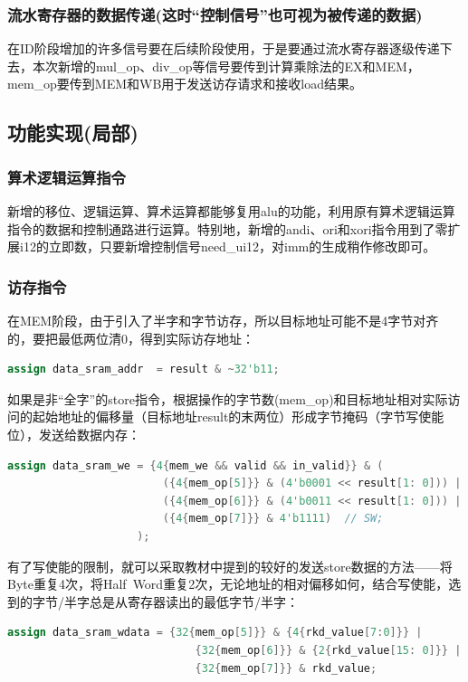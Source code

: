 \documentclass[11pt]{article}
\begin{document}
\subsubsection{流水寄存器的数据传递(这时“控制信号”也可视为被传递的数据)}
在ID阶段增加的许多信号要在后续阶段使用，于是要通过流水寄存器逐级传递下去，本次新增的mul_op、div_op等信号要传到计算乘除法的EX和MEM，mem_op要传到MEM和WB用于发送访存请求和接收load结果。


\subsection{功能实现(局部)}

\subsubsection{算术逻辑运算指令}
新增的移位、逻辑运算、算术运算都能够复用alu的功能，利用原有算术逻辑运算指令的数据和控制通路进行运算。特别地，新增的andi、ori和xori指令用到了零扩展i12的立即数，只要新增控制信号need_ui12，对imm的生成稍作修改即可。

\subsubsection{访存指令}

在MEM阶段，由于引入了半字和字节访存，所以目标地址可能不是4字节对齐的，要把最低两位清0，得到实际访存地址：
\begin{lstlisting}[language=Verilog, caption={访存地址}]
assign data_sram_addr  = result & ~32'b11;
\end{lstlisting}

如果是非“全字”的store指令，根据操作的字节数(mem_op)和目标地址相对实际访问的起始地址的偏移量（目标地址result的末两位）形成字节掩码（字节写使能位），发送给数据内存：
\begin{lstlisting}[language=Verilog, caption={store字节写使能}]
assign data_sram_we = {4{mem_we && valid && in_valid}} & (
                        ({4{mem_op[5]}} & (4'b0001 << result[1: 0])) |  // SB
                        ({4{mem_op[6]}} & (4'b0011 << result[1: 0])) |  // SH
                        ({4{mem_op[7]}} & 4'b1111)  // SW;
                    );
\end{lstlisting}
有了写使能的限制，就可以采取教材中提到的较好的发送store数据的方法——将Byte重复4次，将Half\ Word重复2次，无论地址的相对偏移如何，结合写使能，选到的字节/半字总是从寄存器读出的最低字节/半字：

\begin{lstlisting}[language=Verilog, caption={store数据}]
assign data_sram_wdata = {32{mem_op[5]}} & {4{rkd_value[7:0]}} | 
                             {32{mem_op[6]}} & {2{rkd_value[15: 0]}} |
                             {32{mem_op[7]}} & rkd_value;
\end{lstlisting}
\end{document}
